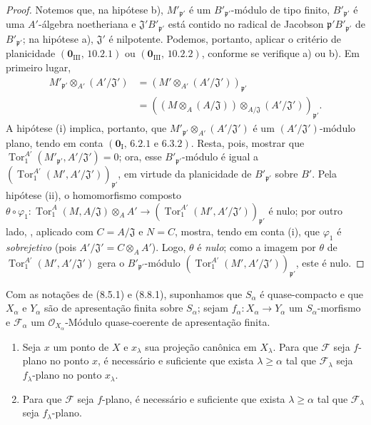 \begin{proof}
Notemos que, na hipótese b), $M'_{\mathfrak p'}$ é um $B'_{\mathfrak p'}$-módulo de tipo finito, $B'_{\mathfrak p'}$ é uma $A'$-álgebra noetheriana e $\mathfrak J'B'_{\mathfrak p'}$ está contido no radical de Jacobson $\mathfrak p'B'_{\mathfrak p'}$ de $B'_{\mathfrak p'}$; na hipótese a), $\mathfrak J'$ é nilpotente. Podemos, portanto, aplicar o critério de planicidade $(\mathbf 0_{\mathrm{III}},\,10.2.1)$ ou $(\mathbf 0_{\mathrm{III}},\,10.2.2)$, conforme se verifique a) ou b). Em primeiro lugar,
\[
\begin{aligned}
M'_{\mathfrak p'}\otimes_{A'}(A'/\mathfrak J')
&=(M'\otimes_{A'}(A'/\mathfrak J'))_{\mathfrak p'}\\
&=((M\otimes_A(A/\mathfrak J))\otimes_{A/\mathfrak J}
(A'/\mathfrak J'))_{\mathfrak p'}.
\end{aligned}
\]
A hipótese (i) implica, portanto, que $M'_{\mathfrak p'}\otimes_{A'}(A'/\mathfrak J')$ é um $(A'/\mathfrak J')$-módulo plano, tendo em conta $(\mathbf 0_{\mathrm I},\,6.2.1\text{ e }6.3.2)$. Resta, pois, mostrar que $\operatorname{Tor}_1^{A'}(M'_{\mathfrak p'},A'/\mathfrak J')=0$; ora, esse $B'_{\mathfrak p'}$-módulo é igual a $(\operatorname{Tor}_1^{A'}(M',A'/\mathfrak J'))_{\mathfrak p'}$, em virtude da planicidade de $B'_{\mathfrak p'}$ sobre $B'$. Pela hipótese (ii), o homomorfismo composto $\theta\circ\varphi_1:\operatorname{Tor}_1^A(M,A/\mathfrak J)\otimes_AA'\to(\operatorname{Tor}_1^{A'}(M',A'/\mathfrak J'))_{\mathfrak p'}$ é nulo; por outro lado, , aplicado com $C=A/\mathfrak J$ e $N=C$, mostra, tendo em conta (i), que $\varphi_1$ é \emph{sobrejetivo} (pois $A'/\mathfrak J'=C\otimes_AA'$). Logo, $\theta$ é \emph{nulo}; como a imagem por $\theta$ de $\operatorname{Tor}_1^{A'}(M',A'/\mathfrak J')$ gera o $B'_{\mathfrak p'}$-módulo $(\operatorname{Tor}_1^{A'}(M',A'/\mathfrak J'))_{\mathfrak p'}$, este é nulo.
\end{proof}

\begin{theorem}[11.2.6]
\label{IV.11.2.6}
Com as notações de (8.5.1) e (8.8.1), suponhamos que $S_\alpha$ é quase-compacto e que $X_\alpha$ e $Y_\alpha$ são de apresentação finita sobre $S_\alpha$; sejam $f_\alpha:X_\alpha\to Y_\alpha$ um $S_\alpha$-morfismo e $\mathcal F_\alpha$ um $\mathcal O_{X_\alpha}$-Módulo quase-coerente de apresentação finita.


\begin{enumerate}[label=\emph{(\roman*)}]
\item Seja $x$ um ponto de $X$ e $x_\lambda$ sua projeção canônica em $X_\lambda$. Para que $\mathcal F$ seja $f$-plano no ponto $x$, é necessário e suficiente que exista $\lambda\geq\alpha$ tal que $\mathcal F_\lambda$ seja $f_\lambda$-plano no ponto $x_\lambda$.
\item Para que $\mathcal F$ seja $f$-plano, é necessário e suficiente que exista $\lambda\geq\alpha$ tal que $\mathcal F_\lambda$ seja $f_\lambda$-plano.
\end{enumerate}
\end{theorem}

